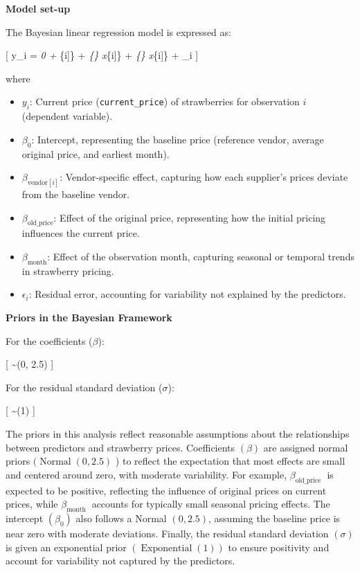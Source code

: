 \documentclass[
  letterpaper,
  DIV=11,
  numbers=noendperiod]{scrartcl}
\providecommand{\tightlist}{%
  \setlength{\itemsep}{0pt}\setlength{\parskip}{0pt}}\usepackage{longtable,booktabs,array}
\begin{document}
\textbf{Model set-up}

The Bayesian linear regression model is expressed as:

{[} y\_i = \beta\emph{0 + \beta}\{\text{vendor}{[}i{]}\} +
\beta\emph{\{\} \cdot x}\{\text{old\_price}{[}i{]}\} +
\beta\emph{\{\} \cdot x}\{\text{month}{[}i{]}\} +
\epsilon\_i {]}

where

\begin{itemize}
\tightlist
\item
  \(y_i\): Current price (\texttt{current\_price}) of strawberries for
  observation \(i\) (dependent variable).\\
\item
  \(\beta_0\): Intercept, representing the baseline price (reference
  vendor, average original price, and earliest month).\\
\item
  \(\beta_{\text{vendor}[i]}\): Vendor-specific effect, capturing how
  each supplier's prices deviate from the baseline vendor.\\
\item
  \(\beta_{\text{old\_price}}\): Effect of the original price,
  representing how the initial pricing influences the current price.\\
\item
  \(\beta_{\text{month}}\): Effect of the observation month, capturing
  seasonal or temporal trends in strawberry pricing.\\
\item
  \(\epsilon_i\): Residual error, accounting for variability not
  explained by the predictors.
\end{itemize}

\textbf{Priors in the Bayesian Framework}

For the coefficients (\(\beta\)):

{[} \beta \sim {}(0, 2.5) {]}

For the residual standard deviation (\(\sigma\)):

{[} \sigma \sim {}(1) {]}

The priors in this analysis reflect reasonable assumptions about the
relationships between predictors and strawberry prices. Coefficients
\((\beta)\) are assigned normal priors \((\operatorname{Normal}(0,2.5)\)
) to reflect the expectation that most effects are small and centered
around zero, with moderate variability. For example,
\(\beta_{\text {old_price }}\) is expected to be positive, reflecting
the influence of original prices on current prices, while
\(\beta_{\text {month }}\) accounts for typically small seasonal pricing
effects. The intercept \(\left(\beta_0\right)\) also follows a Normal
\((0,2.5)\), assuming the baseline price is near zero with moderate
deviations. Finally, the residual standard deviation \((\sigma)\) is
given an exponential prior \((\operatorname{Exponential}(1))\) to ensure
positivity and account for variability not captured by the predictors.
\end{document}
